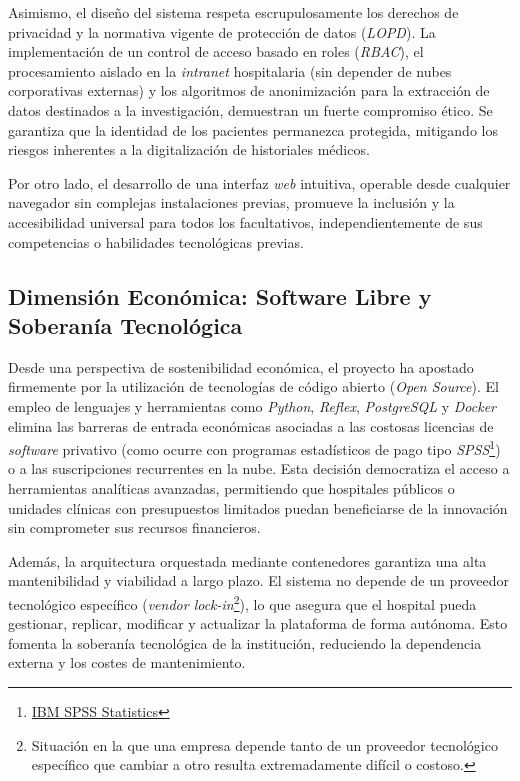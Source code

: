 Asimismo, el diseño del sistema respeta escrupulosamente los derechos de privacidad y la normativa vigente de protección de datos (\textit{LOPD}). La implementación de un control de acceso basado en roles (\textit{RBAC}), el procesamiento aislado en la \textit{intranet} hospitalaria (sin depender de nubes corporativas externas) y los algoritmos de anonimización para la extracción de datos destinados a la investigación, demuestran un fuerte compromiso ético. Se garantiza que la identidad de los pacientes permanezca protegida, mitigando los riesgos inherentes a la digitalización de historiales médicos. 

Por otro lado, el desarrollo de una interfaz \textit{web} intuitiva, operable desde cualquier navegador sin complejas instalaciones previas, promueve la inclusión y la accesibilidad universal para todos los facultativos, independientemente de sus competencias o habilidades tecnológicas previas.

\subsection{Dimensión Económica: Software Libre y Soberanía Tecnológica}
Desde una perspectiva de sostenibilidad económica, el proyecto ha apostado firmemente por la utilización de tecnologías de código abierto (\textit{Open Source}). El empleo de lenguajes y herramientas como \textit{Python}, \textit{Reflex}, \textit{PostgreSQL} y \textit{Docker} elimina las barreras de entrada económicas asociadas a las costosas licencias de \textit{software} privativo (como ocurre con programas estadísticos de pago tipo \textit{SPSS}\footnote{\href{https://www.ibm.com/es-es/products/spss-statistics}{IBM SPSS Statistics}}) o a las suscripciones recurrentes en la nube. Esta decisión democratiza el acceso a herramientas analíticas avanzadas, permitiendo que hospitales públicos o unidades clínicas con presupuestos limitados puedan beneficiarse de la innovación sin comprometer sus recursos financieros.

Además, la arquitectura orquestada mediante contenedores garantiza una alta mantenibilidad y viabilidad a largo plazo. El sistema no depende de un proveedor tecnológico específico (\textit{vendor lock-in}\footnote{Situación en la que una empresa depende tanto de un proveedor tecnológico específico que cambiar a otro resulta extremadamente difícil o costoso.}), lo que asegura que el hospital pueda gestionar, replicar, modificar y actualizar la plataforma de forma autónoma. Esto fomenta la soberanía tecnológica de la institución, reduciendo la dependencia externa y los costes de mantenimiento.

